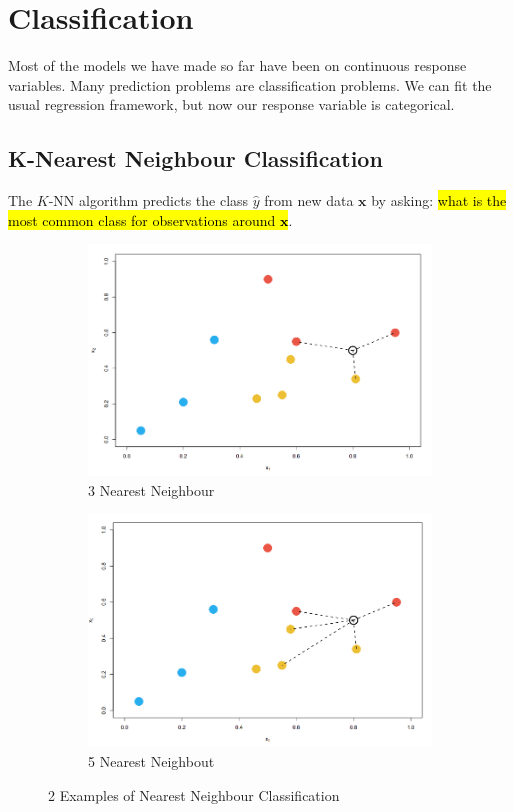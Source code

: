 \documentclass[11pt]{article}
\begin{document}
\newpage
\section{Classification}

Most of the models we have made so far have been on continuous response variables. Many prediction problems are classification problems. We can fit the usual regression framework, but now our response variable is categorical.

\subsection{K-Nearest Neighbour Classification}

The $K$-NN algorithm predicts the class $\hat{y}$ from new data $\mathbf{x}$ by asking: \hl{what is the most common class for observations around $\mathbf{x}$}.

\begin{figure}[h]
\centering
\begin{subfigure}{.5\textwidth}
  \centering
  \includegraphics[width=\linewidth]{pic/image.png}
  \caption{3 Nearest Neighbour}
  \label{fig:3nn}
\end{subfigure}%
\begin{subfigure}{.5\textwidth}
  \centering
  \includegraphics[width=\linewidth]{pic/5nn.png}
  \caption{5 Nearest Neighbout}
  \label{fig:5nn}
\end{subfigure}
\caption{2 Examples of Nearest Neighbour Classification}
\label{fig:KNN}
\end{figure}
\end{document}
